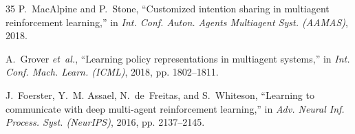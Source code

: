 \documentclass[conference]{IEEEtran}
\begin{document}
\begin{thebibliography}{35}
P.~MacAlpine and P.~Stone, ``Customized intention sharing in multiagent reinforcement learning,'' in \emph{Int. Conf. Auton. Agents Multiagent Syst. (AAMAS)}, 2018.

A.~Grover \emph{et~al.}, ``Learning policy representations in multiagent systems,'' in \emph{Int. Conf. Mach. Learn. (ICML)}, 2018, pp. 1802--1811.

J.~Foerster, Y.~M. Assael, N.~de~Freitas, and S.~Whiteson, ``Learning to communicate with deep multi-agent reinforcement learning,'' in \emph{Adv. Neural Inf. Process. Syst. (NeurIPS)}, 2016, pp. 2137--2145.

\end{thebibliography}
\end{document}
